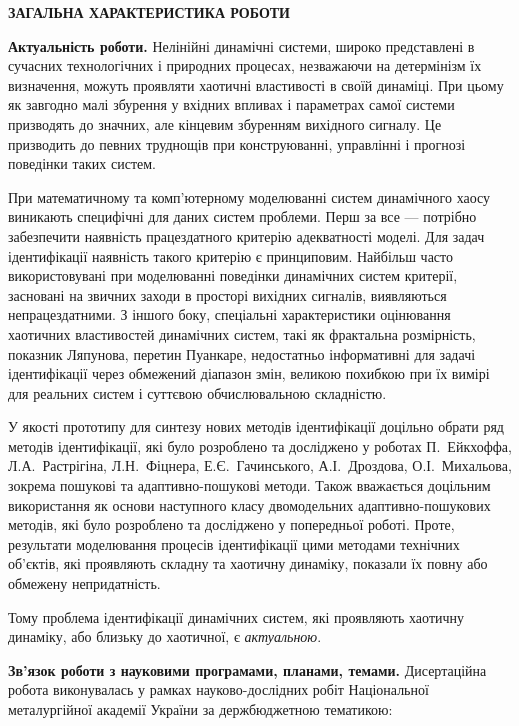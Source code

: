 \documentclass[a4paper,13pt]{atuaref}
\newcommand{\xsect}[1]{\medskip\begin{center}\textbf{#1}\end{center}\medskip\penalty10000}
\begin{document}
\clearpage


\setcounter{page}{1}

\xsect{ЗАГАЛЬНА ХАРАКТЕРИСТИКА РОБОТИ}

\textbf{Актуальність роботи.}
Нелінійні динамічні системи, широко представлені в сучасних технологічних і
природних процесах, незважаючи на детермінізм їх визначення, можуть проявляти
хаотичні властивості в своїй динаміці. При цьому як завгодно малі збурення у вхідних
впливах і параметрах самої системи призводять до значних, але кінцевим збуренням
вихідного сигналу. Це призводить до певних труднощів при конструюванні,
управлінні і прогнозі поведінки таких систем.

При математичному та комп'ютерному моделюванні систем динамічного хаосу
виникають специфічні для даних систем проблеми. Перш за все --- потрібно
забезпечити наявність працездатного критерію адекватності моделі. Для задач
ідентифікації наявність такого критерію є принциповим. Найбільш часто
використовувані при моделюванні поведінки динамічних систем критерії, засновані
на звичних заходи в просторі вихідних сигналів, виявляються непрацездатними. З
іншого боку, спеціальні характеристики оцінювання хаотичних властивостей динамічних
систем, такі як фрактальна розмірність, показник Ляпунова, перетин Пуанкаре,
недостатньо інформативні для задачі ідентифікації через обмежений діапазон
змін, великою похибкою при їх вимірі для реальних систем і суттєвою
обчислювальною складністю.

У якості прототипу для синтезу нових методів ідентифікації доцільно обрати ряд
методів ідентифікації, які було розроблено та досліджено у роботах
П.~Ейкхоффа, Л.А.~Растрігіна, Л.Н.~Фіцнера, Е.Є.~Гачинського,
А.І.~Дроздова, О.І.~Михальова, зокрема пошукові та адаптивно-пошукові
методи.
Також вважається доцільним використання як основи
наступного класу двомодельних адаптивно-пошукових методів,
які було розроблено та досліджено у попередньої роботі.
Проте, результати моделювання процесів ідентифікації цими методами
технічних об'єктів, які проявляють складну та хаотичну динаміку, показали
їх повну або обмежену непридатність.


Тому проблема ідентифікації динамічних систем, які проявляють хаотичну
динаміку, або близьку до хаотичної, є
\textit{актуальною}.

\smallskip
\textbf{Зв'язок роботи з науковими програмами, планами, темами.}
Дисертаційна робота виконувалась у рамках науково-дослідних робіт
Національної металургійної академії України за держбюджетною
тематикою:
\end{document}
